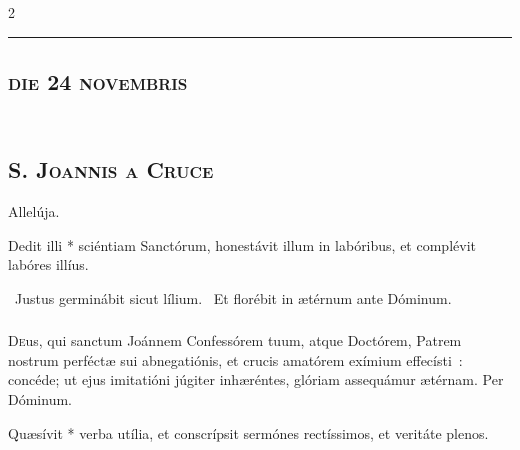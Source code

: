 \documentclass[9pt,twoside]{extarticle}
\begin{document}
\begin{multicols}{2}
\begin{center}\textcolor{red}{\rule{\linewidth}{0.5pt}} \end{center}

\subsection*{\center \normalfont \textsc{die 24 novembris}}
\subsection*{\\ \textbf{\textsc{S. Joannis a Cruce}}}

\small {}

 Allelúja.

\normalsize
{} Dedit illi * sciéntiam Sanctórum, honestávit illum in labóribus, et complévit labóres illíus.

~Justus germinábit sicut lílium. ~Et florébit in ætérnum ante Dóminum.

\subsubsection*{\center {}}
\lettrine{D}eus, qui sanctum Joánnem Confessórem tuum, atque Doctórem, Patrem nostrum perféctæ sui abnegatiónis, et crucis amatórem exímium effecísti~: concéde; ut ejus imitatióni júgiter inhæréntes, glóriam assequámur ætérnam. Per Dóminum.

 Quæsívit * verba utília, et conscrípsit sermónes rectíssimos, et veritáte plenos.


\end{multicols}
\end{document}
